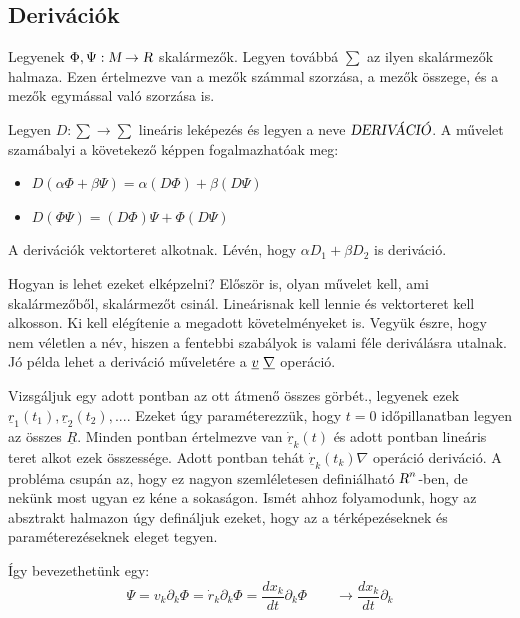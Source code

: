 \documentclass[a4paper, 12pt]{article}
\begin{document}
\subsection{Derivációk}
\par Legyenek $\Phi, \Psi : \textsl{M} \rightarrow \textsl{R}$ skalármezők. Legyen továbbá $\sum$ az ilyen skalármezők halmaza. Ezen értelmezve van a mezők számmal szorzása, a mezők összege, és a mezők egymással való szorzása is.
\par Legyen $D : \sum \rightarrow \sum$ lineáris leképezés és legyen a neve $\textsl{DERIVÁCIÓ}$. A művelet szamábalyi a követekező képpen fogalmazhatóak meg:
\begin{itemize}
\item $D(\alpha\Phi + \beta\Psi) = \alpha(D\Phi) + \beta(D\Psi)$
\item $D(\Phi\Psi) = (D\Phi)\Psi + \Phi(D\Psi)$
\end{itemize}
\par A derivációk vektorteret alkotnak. Lévén, hogy $\alpha D_1 + \beta D_2$ is deriváció.
\newline
\par Hogyan is lehet ezeket elképzelni? Először is, olyan művelet kell, ami skalármezőből, skalármezőt csinál. Lineárisnak kell lennie és vektorteret kell alkosson. Ki kell elégítenie a megadott követelményeket is. Vegyük észre, hogy nem véletlen a név, hiszen a fentebbi szabályok is valami féle deriválásra utalnak. Jó példa lehet a deriváció műveletére a $\underline{v}\hspace{0.1cm}\underline{\nabla}$ operáció. 
\par Vizsgáljuk egy adott pontban az ott átmenő összes görbét., legyenek ezek $\underline{r}_{1}(t_1), \underline{r}_{2}(t_2), ...$. Ezeket úgy paraméterezzük, hogy $t = 0$ időpillanatban legyen az összes $\underline{R}$. Minden pontban értelmezve van $\dot{\underline{r}}_{k}(t)$ és adott pontban lineáris teret alkot ezek összessége. Adott pontban tehát $\dot{\underline{r}}_{k}(t_k)\nabla$ operáció deriváció. A probléma csupán az, hogy ez nagyon szemléletesen definiálható $\textsl{R}^{n}$-ben, de nekünk most ugyan ez kéne a sokaságon. Ismét ahhoz folyamodunk, hogy az absztrakt halmazon úgy defináljuk ezeket, hogy az a térképezéseknek és paraméterezéseknek eleget tegyen. 
\par Így bevezethetünk egy:
\begin{equation*}
    \Psi = v_{k}\partial_{k}\Phi = \dot{r}_{k}\partial_{k}\Phi = \frac{dx_{k}}{dt}\partial_k\Phi \quad \quad \rightarrow \frac{dx_{k}}{dt}\partial_{k}
\end{equation*}
\end{document}
